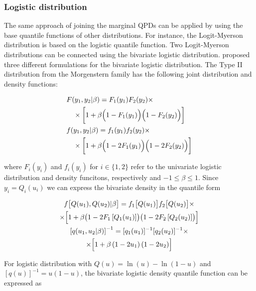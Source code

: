\documentclass[
  fleqn,
  deca,
  blindrev
]{informs4}
\begin{document}
\subsubsection{Logistic distribution}\label{logistic-distribution}

The same approach of joining the marginal QPDs can be applied by using
the base quantile functions of other distributions. For instance, the
Logit-Myerson distribution \citep{wilson2023ReconciliationExpertPriors}
is based on the logistic quantile function. Two Logit-Myerson
distributions can be connected using the bivariate logistic
distribution. \citet{gumbel1961BivariateLogisticDistributions} proposed
three different formulations for the bivariate logistic distribution.
The Type II distribution from the Morgenstern family
\citep{sajeevkumar2014EstimationParameterMorgenstern, basikhasteh2021BayesianEstimationMorgenstern}
has the following joint distribution and density functions:

\[
\begin{aligned}
&F(y_1,y_2\vert\beta)=F_1(y_1)F_2(y_2)\times\\
&\quad \times \biggl[1+\beta\Bigl(1-F_1(y_1)\Bigr)\Bigl(1-F_2(y_2)\Bigr)\biggr]\\
&f(y_1,y_2\vert\beta)=f_1(y_1)f_2(y_2)\times\\
&\quad \times \biggl[1+\beta\Bigl(1-2F_1(y_1)\Bigr)\Bigl(1-2F_2(y_2)\Bigr)\biggr]
\end{aligned}
\]

where \(F_i(y_i)\) and \(f_i(y_i)\) for \(i\in\{1,2\}\) refer to the
univariate logistic distribution and density funcitons, respectively and
\(-1\leq\beta\leq1\). Since \(y_i=Q_i(u_i)\) we can express the
bivariate density in the quantile form

\[
\begin{gathered}
f\bigl[Q(u_1),Q(u_2)\vert\beta\bigr]=f_1\bigl[Q(u_1)\bigr]f_2\bigl[Q(u_2)\bigr]\times\\
\times \Bigl[1+\beta\bigl(1-2F_1\left[Q_1(u_1)\right]\bigr)\bigl(1-2F_2\left[Q_2(u_2)\right]\bigr)\Bigr]\\
\left[q(u_1,u_2\vert\beta)\right]^{-1}=[q_1(u_1)]^{-1}[q_2(u_2)]^{-1} \times\\
\times \Bigl[1+\beta \left(1-2u_1\right)\left(1-2u_2\right)\Bigr]
\end{gathered}
\]

For logistic distribution with \(Q(u)=\ln(u)-\ln(1-u)\) and
\([q(u)]^{-1}=u(1-u)\), the bivariate logistic density quantile function
can be expressed as
\end{document}
